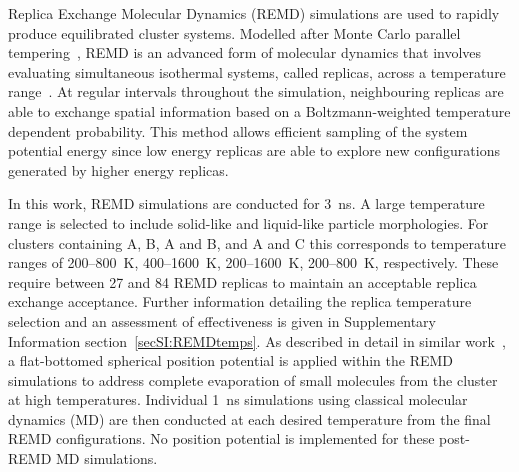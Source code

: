 Replica Exchange Molecular Dynamics (REMD) simulations are used to rapidly produce equilibrated cluster systems. Modelled after Monte Carlo parallel tempering~\cite{Hukushima1996}, REMD is an advanced form of molecular dynamics that involves evaluating simultaneous isothermal systems, called replicas, across a temperature range~\cite{Sugita1999}. At regular intervals throughout the simulation, neighbouring replicas are able to exchange spatial information based on a Boltzmann-weighted temperature dependent probability. This method allows efficient sampling of the system potential energy since low energy replicas are able to explore new configurations generated by higher energy replicas. 

In this work, REMD simulations are conducted for 3~ns. A large temperature range is selected to include solid-like and liquid-like particle morphologies. For clusters containing A, B, A and B, and A and C this corresponds to temperature ranges of 200--800~K, 400--1600~K, 200--1600~K, 200--800~K, respectively. These require between 27 and 84 REMD replicas to maintain an acceptable replica exchange acceptance. Further information detailing the replica temperature selection and an assessment of effectiveness is given in Supplementary Information section~\ref{secSI:REMDtemps}. As described in detail in similar work~\cite{bowal2018partitioning}, a flat-bottomed spherical position potential is applied within the REMD simulations to address complete evaporation of small molecules from the cluster at high temperatures. Individual 1~ns simulations using classical molecular dynamics (MD) are then conducted at each desired temperature from the final REMD configurations. No position potential is implemented for these post-REMD MD simulations.

